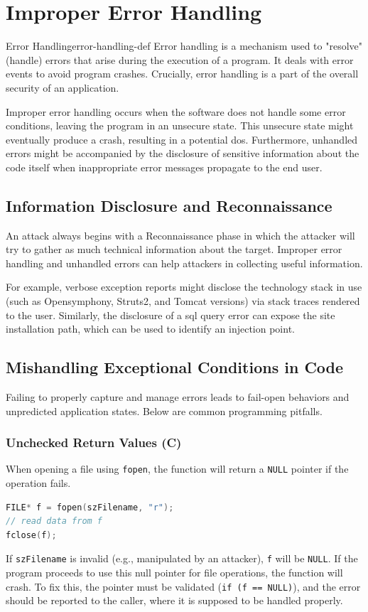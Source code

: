 \chapter{Improper Error Handling}
\label{ch:error_handling}

\begin{concept}{Error Handling}{error-handling-def}
    Error handling is a mechanism used to "resolve" (handle) errors that arise during the execution of a program. It deals with error events to avoid program crashes. Crucially, error handling is a part of the overall security of an application.
\end{concept}

Improper error handling occurs when the software does not handle some error conditions, leaving the program in an unsecure state. This unsecure state might eventually produce a crash, resulting in a potential \gls{dos}. Furthermore, unhandled errors might be accompanied by the disclosure of sensitive information about the code itself when inappropriate error messages propagate to the end user.

\section{Information Disclosure and Reconnaissance}
An attack always begins with a Reconnaissance phase in which the attacker will try to gather as much technical information about the target. Improper error handling and unhandled errors can help attackers in collecting useful information.

For example, verbose exception reports might disclose the technology stack in use (such as Opensymphony, Struts2, and Tomcat versions) via stack traces rendered to the user. Similarly, the disclosure of a \gls{sql} query error can expose the site installation path, which can be used to identify an injection point. 

\section{Mishandling Exceptional Conditions in Code}

Failing to properly capture and manage errors leads to fail-open behaviors and unpredicted application states. Below are common programming pitfalls.

\subsection{Unchecked Return Values (C)}
When opening a file using \texttt{fopen}, the function will return a \texttt{NULL} pointer if the operation fails. 
\begin{lstlisting}[language=C]
FILE* f = fopen(szFilename, "r");
// read data from f
fclose(f);
\end{lstlisting}
If \texttt{szFilename} is invalid (e.g., manipulated by an attacker), \texttt{f} will be \texttt{NULL}. If the program proceeds to use this null pointer for file operations, the function will crash. To fix this, the pointer must be validated (\texttt{if (f == NULL)}), and the error should be reported to the caller, where it is supposed to be handled properly.

